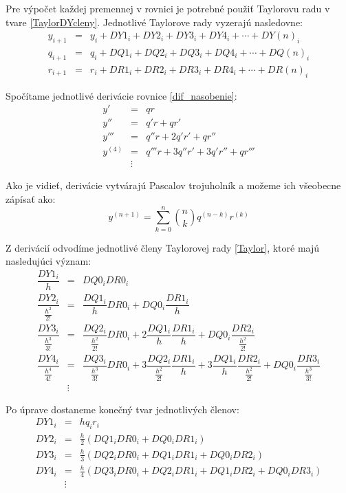 Pre výpočet každej premennej v rovnici je potrebné použiť Taylorovu radu v tvare \eqref{TaylorDYcleny}. Jednotlivé Taylorove rady vyzerajú nasledovne:
\begin{eqnarray}
y_{i + 1} & = & y_{i} + DY1_{i} + DY2_{i} + DY3_{i} + DY4_{i} + \cdots + DY(n)_{i}\\
q_{i+1} & = & q_i + DQ1_i + DQ2_i + DQ3_i + DQ4_i + \cdots + DQ(n)_i\\
r_{i+1} & = & r_i + DR1_i + DR2_i + DR3_i + DR4_i + \cdots + DR(n)_i
\end{eqnarray}


Spočítame jednotlivé derivácie rovnice \eqref{dif_nasobenie}:
\begin{eqnarray}
y' & = & qr \nonumber \\
y'' & = & q'r + qr' \nonumber \\
y''' & = & q''r + 2q'r' + qr'' \nonumber \\
y^{(4)} & = & q'''r + 3q''r'+ 3q'r'' + qr''' \nonumber \\
 & \vdots \nonumber &
\end{eqnarray}


Ako je vidieť, derivácie vytvárajú Pascalov trojuholník a možeme ich všeobecne zápísať ako:
\begin{equation}
y^{(n+1)} = \sum_{k=0}^n \binom{n}{k} q^{(n-k)} r^{(k)} \nonumber
\end{equation}
\bigskip

Z derivácií odvodíme jednotlivé členy Taylorovej rady \eqref{Taylor}, ktoré majú nasledujúci význam:
\begin{eqnarray}
\dfrac{DY1_{i}}{h} & = & DQ0_i DR0_i \\
\dfrac{DY2_{i}}{\frac{h^{2}}{2!}} & = & \dfrac{DQ1_i}{h} DR0_i + DQ0_i \dfrac{DR1_i}{h} \nonumber \\
\dfrac{DY3_{i}}{\frac{h^{3}}{3!}} & = & \dfrac{DQ2_i}{\frac{h^{2}}{2!}} DR0_i + 2 \dfrac{DQ1_i}{h} \dfrac{DR1_i}{h} + DQ0_i \dfrac{DR2_i}{\frac{h^{2}}{2!}} \nonumber \\
\dfrac{DY4_{i}}{\frac{h^{4}}{4!}} & = & \dfrac{DQ3_i}{\frac{h^{3}}{3!}} DR0_i + 3 \dfrac{DQ2_i}{\frac{h^{2}}{2!}} \dfrac{DR1_i}{h} + 3 \dfrac{DQ1_i}{h} \dfrac{DR2_i}{\frac{h^{2}}{2!}} + DQ0_i \dfrac{DR3_i}{\frac{h^{3}}{3!}} \nonumber \\
& \vdots \nonumber & 
\end{eqnarray}



Po úprave dostaneme konečný tvar jednotlivých členov:
\begin{eqnarray}
DY1_{i} & = & hq_{i}r_{i} \label{DY1_cleny_nasobenia} \\
DY2_{i} & = & \frac{h}{2} (DQ1_{i}DR0_{i} + DQ0_{i}DR1_{i}) \label{DY2_cleny_nasobenia} \\
DY3_{i} & = & \frac{h}{3} (DQ2_{i}DR0_{i} + DQ1_{i}DR1_{i} + DQ0_{i}DR2_{i}) \label{DY3_cleny_nasobenia} \\
DY4_{i} & = & \frac{h}{4} (DQ3_{i}DR0_{i} + DQ2_{i}DR1_{i} + DQ1_{i}DR2_{i} + DQ0_{i}DR3_{i}) \label{DY4_cleny_nasobenia} \\
& \vdots \nonumber &
\end{eqnarray}

